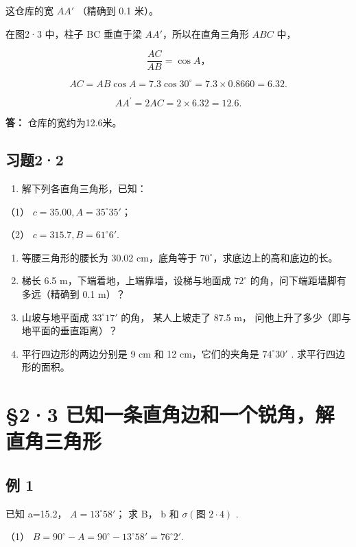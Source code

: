 这仓库的宽 \(AA'\) （精确到 0.1 米）。

 在图2·3 中，柱子 BC 垂直于梁 \(AA'\)，所以在直角三角形
\(ABC\) 中，

\[
\frac {A C}{A B} = \cos A\text{，}
\]

\[
A C = A B \cos A = 7.3 \cos 30 ^{\circ} = 7.3 \times 0.8660 = 6.32.
\]

\[
A A ^{\prime} = 2 A C = 2 \times 6.32 = 12.6.
\]

\textbf{答：} 仓库的宽约为12.6米。

\subsection{习题2·2}

\begin{enumerate}
\item
  解下列各直角三角形，已知：
\end{enumerate}

（1） \(c = 35.00, A = 35^{\circ}35'\)；

（2） \(c = 315.7, B = 61^{\circ}6'\).

\begin{enumerate}[start=2]
\item
  等腰三角形的腰长为 30.02 cm，底角等于
  \(70^{\circ}\)，求底边上的高和底边的长。
\item
  梯长 6.5 m，下端着地，上端靠墙，设梯与地面成 \(72^{\circ}\)
  的角，问下端距墙脚有多远（精确到 0.1 m）？
\item
  山坡与地平面成 \(33^{\circ}17'\) 的角， 某人上坡走了 87.5 m，
  问他上升了多少（即与地平面的垂直距离）？
\item
  平行四边形的两边分别是 9 cm 和 12 cm，它们的夹角是 \(74^{\circ}30'\) .
  求平行四边形的面积。
\end{enumerate}

\section{§2·3 已知一条直角边和一个锐角，解直角三角形}

\subsection{例 1}

已知 a=15.2， \(A=13^{\circ}58'\)； 求 B， b 和
\(\sigma(\text{图 }2\cdot4)\) .

 （1）
\(B = 90^{\circ} - A = 90^{\circ} - 13^{\circ}58' = 76^{\circ}2'\).

